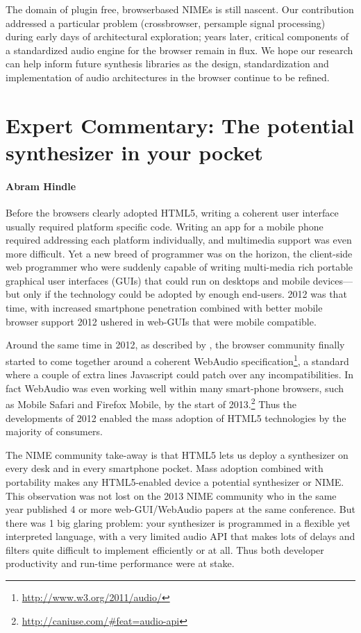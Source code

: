 The domain of plug­in free, browser­based NIMEs is still nascent. Our contribution addressed a particular problem (cross­browser, per­sample signal processing) during early days of architectural exploration; years later, critical components of a standardized audio engine for the browser remain in flux. We hope our research can help inform future synthesis libraries as the design, standardization and implementation of audio architectures in the browser continue to be refined.


\section*{Expert Commentary: The potential synthesizer in your pocket}

\paragraph{Abram Hindle} 

Before the browsers clearly adopted HTML5, writing a coherent user interface usually required platform specific code. Writing an app for a mobile phone required addressing each platform individually, and multimedia support was even more difficult. Yet a new breed of programmer was on the horizon, the client-side web programmer who were suddenly capable of writing multi-media rich portable graphical user interfaces (GUIs) that could run on desktops and mobile devices---but only if the technology could be adopted by enough end-users. 2012 was that time, with increased smartphone penetration combined with better mobile browser support 2012 ushered in web-GUIs that were mobile compatible.

Around the same time in 2012, as described by  \cite{Roberts:2013}, the browser community finally started to come together around a coherent WebAudio specification\footnote{\url{http://www.w3.org/2011/audio/}}, a standard where a couple of extra lines Javascript could patch over any incompatibilities. In fact WebAudio was even working well within many smart-phone browsers, such as Mobile Safari and Firefox Mobile, by the start of 2013.\footnote{\url{http://caniuse.com/\#feat=audio-api}} Thus the developments of 2012 enabled the mass adoption of HTML5 technologies by the majority of consumers.

The NIME community take-away is that HTML5 lets us deploy a synthesizer on every desk and in every smartphone pocket. Mass adoption combined with portability makes any HTML5-enabled device a potential synthesizer or NIME. This observation was not lost on the 2013 NIME community who in the same year published 4 or more web-GUI/WebAudio papers at the same conference. But there was 1 big glaring problem: your synthesizer is programmed in a flexible yet interpreted language, with a very limited audio API that makes lots of delays and filters quite difficult to implement efficiently or at all. Thus both developer productivity and run-time performance were at stake.

